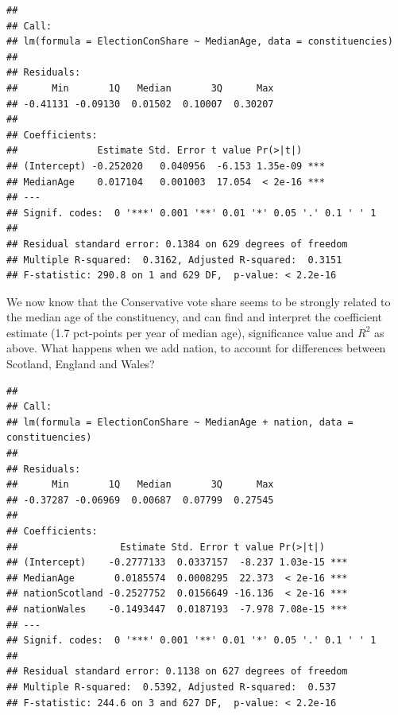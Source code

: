 \documentclass[
]{book}
\newenvironment{Shaded}{\begin{snugshade}}{\end{snugshade}}
\newcommand{\CommentTok}[1]{\textcolor[rgb]{0.56,0.35,0.01}{\textit{#1}}}
\newcommand{\DataTypeTok}[1]{\textcolor[rgb]{0.13,0.29,0.53}{#1}}
\newcommand{\KeywordTok}[1]{\textcolor[rgb]{0.13,0.29,0.53}{\textbf{#1}}}
\newcommand{\NormalTok}[1]{#1}
\newcommand{\OperatorTok}[1]{\textcolor[rgb]{0.81,0.36,0.00}{\textbf{#1}}}
\newcommand{\StringTok}[1]{\textcolor[rgb]{0.31,0.60,0.02}{#1}}
\begin{document}
\begin{verbatim}
## 
## Call:
## lm(formula = ElectionConShare ~ MedianAge, data = constituencies)
## 
## Residuals:
##      Min       1Q   Median       3Q      Max 
## -0.41131 -0.09130  0.01502  0.10007  0.30207 
## 
## Coefficients:
##              Estimate Std. Error t value Pr(>|t|)    
## (Intercept) -0.252020   0.040956  -6.153 1.35e-09 ***
## MedianAge    0.017104   0.001003  17.054  < 2e-16 ***
## ---
## Signif. codes:  0 '***' 0.001 '**' 0.01 '*' 0.05 '.' 0.1 ' ' 1
## 
## Residual standard error: 0.1384 on 629 degrees of freedom
## Multiple R-squared:  0.3162,	Adjusted R-squared:  0.3151 
## F-statistic: 290.8 on 1 and 629 DF,  p-value: < 2.2e-16
\end{verbatim}

We now know that the Conservative vote share seems to be strongly
related to the median age of the constituency, and can find and
interpret the coefficient estimate (1.7 pct-points per year of median
age), significance value and \(R^2\) as above. What happens when we add
nation, to account for differences between Scotland, England and Wales?

\begin{Shaded}
\end{Shaded}

\begin{verbatim}
## 
## Call:
## lm(formula = ElectionConShare ~ MedianAge + nation, data = constituencies)
## 
## Residuals:
##      Min       1Q   Median       3Q      Max 
## -0.37287 -0.06969  0.00687  0.07799  0.27545 
## 
## Coefficients:
##                  Estimate Std. Error t value Pr(>|t|)    
## (Intercept)    -0.2777133  0.0337157  -8.237 1.03e-15 ***
## MedianAge       0.0185574  0.0008295  22.373  < 2e-16 ***
## nationScotland -0.2527752  0.0156649 -16.136  < 2e-16 ***
## nationWales    -0.1493447  0.0187193  -7.978 7.08e-15 ***
## ---
## Signif. codes:  0 '***' 0.001 '**' 0.01 '*' 0.05 '.' 0.1 ' ' 1
## 
## Residual standard error: 0.1138 on 627 degrees of freedom
## Multiple R-squared:  0.5392,	Adjusted R-squared:  0.537 
## F-statistic: 244.6 on 3 and 627 DF,  p-value: < 2.2e-16
\end{verbatim}
\end{document}
